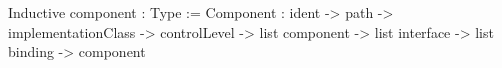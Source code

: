 Inductive component : Type :=
    Component : ident -> path -> implementationClass ->
                controlLevel -> list component -> list interface -> 
                list binding -> component